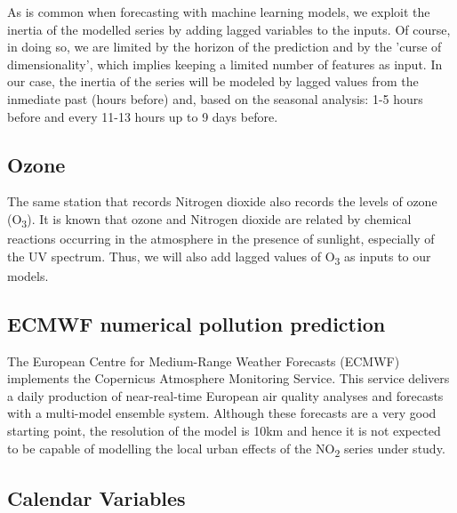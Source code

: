 \documentclass[a4paper,3p,sort&compress]{elsarticle}
\begin{document}
As is common when forecasting with machine learning models, we exploit
the inertia of the modelled series by adding lagged variables to the
inputs. Of course, in doing so, we are limited by the horizon of the
prediction and by the 'curse of dimensionality', which implies keeping
a limited number of features as input. In our case, the inertia of the
series will be modeled by lagged values from the inmediate past (hours
before) and, based on the seasonal analysis: 1-5 hours before and
every 11-13 hours up to 9 days before.

\subsection{Ozone}


The same station that records Nitrogen dioxide also records the levels
of ozone (O\textsubscript{3}). It is known that ozone and Nitrogen
dioxide are related by chemical reactions occurring in the atmosphere
in the presence of sunlight, especially of the UV spectrum.  %
Thus, we will also add lagged values of O\textsubscript{3} as inputs
to our models.

\subsection{ECMWF numerical pollution prediction}
\label{sec:ecmwf-numer-poll}

The European Centre for Medium-Range Weather Forecasts (ECMWF)
implements the Copernicus Atmosphere Monitoring Service.  This service
delivers a daily production of near-real-time European air quality
analyses and forecasts with a multi-model ensemble system. Although
these forecasts are a very good starting point, 
the resolution of the model is 10km
and hence it is not expected to be capable of modelling the local
urban effects of the NO\textsubscript{2} series under study.

\subsection{Calendar Variables}
\label{sec:cal_data}
\end{document}

